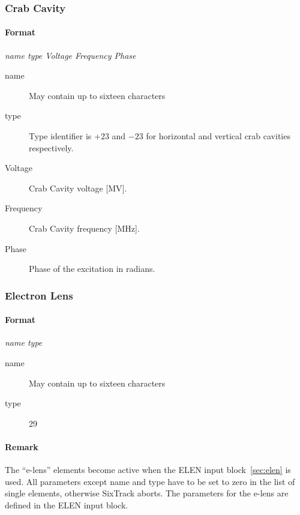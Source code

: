 \documentclass[a4paper,11pt]{report}
\begin{document}

\subsubsection{Crab Cavity} \label{CrabCav}

\paragraph{Format} {\em name type Voltage Frequency Phase}
\begin{description}
\item [name] May contain up to sixteen characters
\item [type] Type identifier is $+23$ and $-23$ for horizontal and vertical
  crab cavities respectively.
\item [Voltage] Crab Cavity voltage [MV].
\item [Frequency] Crab Cavity frequency [MHz]. 
\item [Phase] Phase of the excitation in radians.
\end{description}


\subsubsection{Electron Lens} \label{ELEN}
\paragraph{Format} {\em name type}
\begin{description}
	\item [name] May contain up to sixteen characters
	\item [type] 29
\end{description}

\paragraph{Remark}
The ``e-lens'' elements become active when the
ELEN input block~\ref{sec:elen} is used. All parameters except name and type have to be set to zero in the list of single elements, otherwise SixTrack aborts. The parameters for the e-lens are defined in the ELEN input block.
\end{document}
